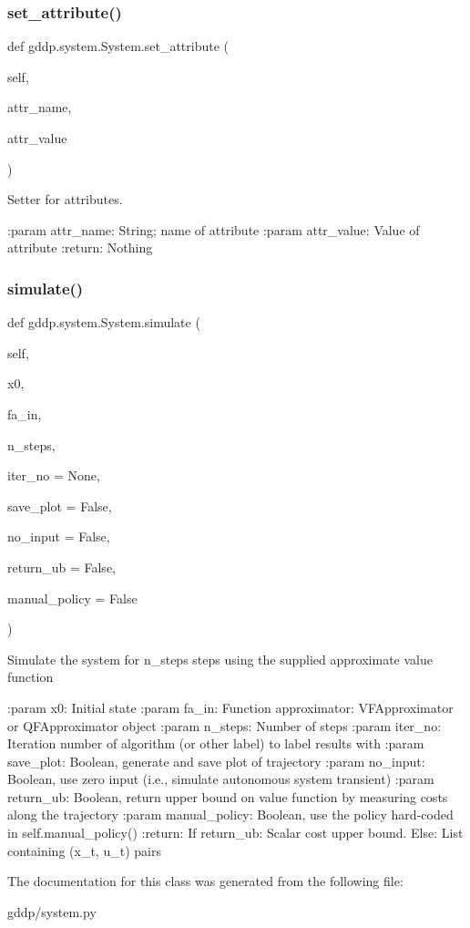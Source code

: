 \subsubsection{\texorpdfstring{set\_attribute()}{set\_attribute()}}
{\footnotesize\ttfamily def gddp.\+system.\+System.\+set\+\_\+attribute (\begin{DoxyParamCaption}\item[{}]{self,  }\item[{}]{attr\+\_\+name,  }\item[{}]{attr\+\_\+value }\end{DoxyParamCaption})}

\begin{DoxyVerb}Setter for attributes.

:param attr_name: String; name of attribute
:param attr_value: Value of attribute
:return: Nothing
\end{DoxyVerb}
 \mbox{\label{classgddp_1_1system_1_1_system_ab09b391c54b83eff64c7724fc6d5d554}} 
\subsubsection{\texorpdfstring{simulate()}{simulate()}}
{\footnotesize\ttfamily def gddp.\+system.\+System.\+simulate (\begin{DoxyParamCaption}\item[{}]{self,  }\item[{}]{x0,  }\item[{}]{fa\+\_\+in,  }\item[{}]{n\+\_\+steps,  }\item[{}]{iter\+\_\+no = {\ttfamily None},  }\item[{}]{save\+\_\+plot = {\ttfamily False},  }\item[{}]{no\+\_\+input = {\ttfamily False},  }\item[{}]{return\+\_\+ub = {\ttfamily False},  }\item[{}]{manual\+\_\+policy = {\ttfamily False} }\end{DoxyParamCaption})}

\begin{DoxyVerb}Simulate the system for n_steps steps using the supplied approximate value function

:param x0: Initial state
:param fa_in: Function approximator: VFApproximator or QFApproximator object
:param n_steps: Number of steps
:param iter_no: Iteration number of algorithm (or other label) to label results with
:param save_plot: Boolean, generate and save plot of trajectory
:param no_input: Boolean, use zero input (i.e., simulate autonomous system transient)
:param return_ub: Boolean, return upper bound on value function by measuring costs along
    the trajectory
:param manual_policy: Boolean, use the policy hard-coded in self.manual_policy()
:return: If return_ub: Scalar cost upper bound. Else: List containing (x_t, u_t) pairs
\end{DoxyVerb}
 

The documentation for this class was generated from the following file\+:\begin{DoxyCompactItemize}
\item 
gddp/system.\+py\end{DoxyCompactItemize}
